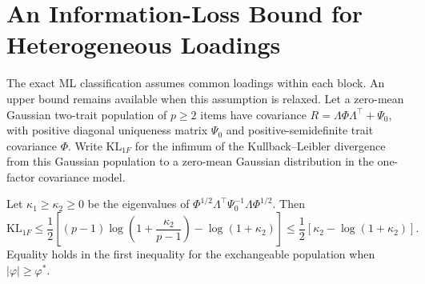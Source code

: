\section{An Information-Loss Bound for Heterogeneous Loadings}
\label{app:ceiling}

The exact ML classification assumes common loadings within each block. An upper bound remains available when this assumption is relaxed. Let a zero-mean Gaussian two-trait population of $p\ge2$ items have covariance $R=\Lambda\Phi\Lambda^\top+\Psi_0$, with positive diagonal uniqueness matrix $\Psi_0$ and positive-semidefinite trait covariance $\Phi$. Write $\mathrm{KL}_{1F}$ for the infimum of the Kullback--Leibler divergence from this Gaussian population to a zero-mean Gaussian distribution in the one-factor covariance model.

\begin{proposition}
\label{prop:ceiling}
Let $\kappa_1\ge\kappa_2\ge0$ be the eigenvalues of
$\Phi^{1/2}\Lambda^\top\Psi_0^{-1}\Lambda\Phi^{1/2}$.
Then
\[
\mathrm{KL}_{1F}\le
\frac12\left[(p-1)\log\left(1+\frac{\kappa_2}{p-1}\right)
-\log(1+\kappa_2)\right]
\le\frac12\left[\kappa_2-\log(1+\kappa_2)\right].
\]
Equality holds in the first inequality for the exchangeable population when $|\varphi|\ge\varphi^*$.
\end{proposition}

